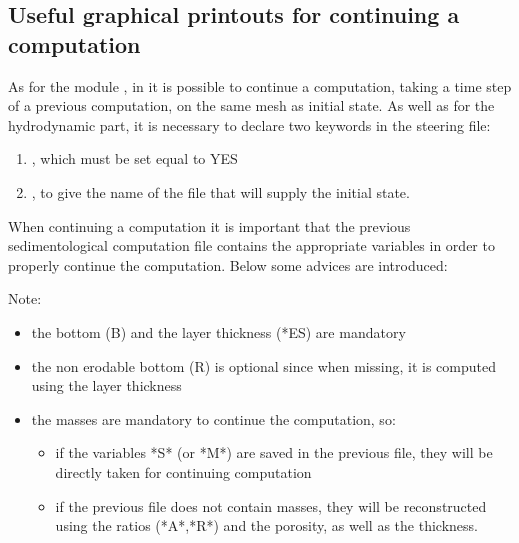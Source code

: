 \subsection{Useful graphical printouts for continuing a computation}
As for the module , in \gaia{} it is possible to continue a computation, taking a time step of a previous computation, on the same mesh as initial state.
As well as for the hydrodynamic part, it is necessary to declare two keywords in the steering file:
\begin{enumerate}
\item {}, which must be set equal to YES
\item {}, to give the name of the file that will supply the initial state.
\end{enumerate}
When continuing a computation it is important that the previous sedimentological computation file contains the appropriate variables in order to properly continue the computation. Below some advices are introduced:

\begin{WarningBlock}{Note:}
\begin{itemize}
\item the bottom (B) and the layer thickness (*ES) are mandatory
\item the non erodable bottom (R) is optional since when missing, it is computed using the layer thickness
\item the masses are mandatory to continue the computation, so:
\begin{itemize}
 \item if the variables *S* (or *M*) are saved in the previous file, they will be directly taken for continuing computation
 \item if the previous file does not contain masses, they will be reconstructed using the ratios (*A*,*R*) and the porosity, as well as the thickness.
\end{itemize}
\end{itemize}
\end{WarningBlock}
%
